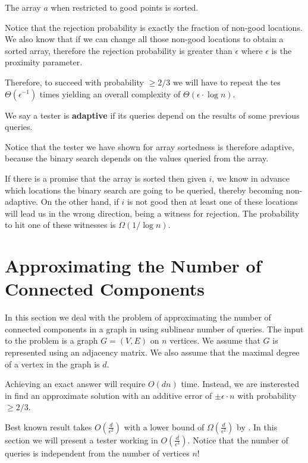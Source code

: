 \begin{corollary}
The array $a$ when restricted to good points is sorted.
\end{corollary}

Notice that the rejection probability is exactly the fraction of non-good locations.
We also know that if we can change all those non-good locations to obtain a sorted array, therefore the rejection probability is greater than $\epsilon$ where $\epsilon$ is the proximity parameter.

Therefore, to succeed with probability $\geq 2/3$ we will have to repeat the tes $\Theta(\epsilon^{-1})$ times yielding an overall complexity of $\Theta(\epsilon \cdot \log n)$.

\begin{definition}[Adaptiveness]
We say a tester is \textbf{adaptive} if its queries depend on the results of some previous queries.
\end{definition}

Notice that the tester we have shown for array sortedness is therefore adaptive, because the binary search depends on the values queried from the array.

If there is a promise that the array is sorted then given $i$, we know in advance which locations the binary search are going to be queried, thereby becoming non-adaptive.
On the other hand, if $i$ is not good then at least one of these locations will lead us in the wrong direction, being a witness for rejection.
The probability to hit one of these witnesses is $\Omega(1/\log n)$.


\section{Approximating the Number of Connected Components}

In this section we deal with the problem of approximating the number of connected components in a graph in using sublinear number of queries. 
The input to the problem is a graph $G=(V,E)$ on $n$ vertices. We assume that $G$ is represented using an adjacency matrix. 
We also assume that the maximal degree of a vertex in the graph is $d$.

Achieving an exact answer will require $O(dn)$ time.
Instead, we are insterested in find an approximate solution with an additive error of $\pm \epsilon \cdot n$ with probability $\geq 2/3$.

Best known result takes $O(\frac{d}{\epsilon^2})$ with a lower bound of $\Omega(\frac{d}{\epsilon^2})$ by \cite{Chazelle2005ApproximatingTM}.
In this section we will present a tester working in $O(\frac{d}{\epsilon^3})$. Notice that the number of queries is independent from the number of vertices $n$!

